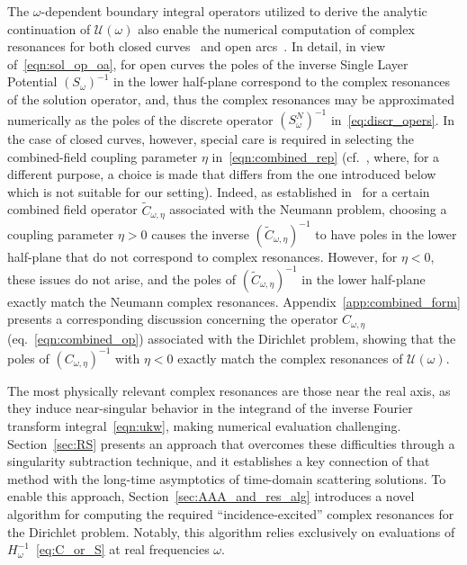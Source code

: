 \documentclass[11pt]{article}
\theoremstyle{plain}
\theoremstyle{remark}
\begin{document}
The $\omega$-dependent boundary integral operators utilized to derive
the analytic continuation of $\mathcal{U}(\omega)$ also enable the
numerical computation of complex resonances for both closed
curves~\cite{steinbach2017combined} and open arcs~\cite[Sec.
2]{bst}. In detail, in view of~\eqref{eqn:sol_op_oa}, for open curves
the poles of the inverse Single Layer Potential $(S_\omega)^{-1}$ in
the lower half-plane correspond to the complex resonances of the
solution operator, and, thus the complex resonances may be
approximated numerically as the poles of the discrete operator
$(S_\omega^N)^{-1}$ in~\eqref{eq:discr_opers}. In the case of closed
curves, however, special care is required in selecting the
combined-field coupling parameter $\eta$ in~\eqref{eqn:combined_rep}
(cf.~\cite{taylorbook}, where, for a different purpose, a choice is
made that differs from the one introduced below which is not suitable
for our setting).  Indeed, as established
in~\cite{steinbach2017combined} for a certain combined field operator
$\widetilde{C}_{\omega,\eta}$ associated with the Neumann problem,
choosing a coupling parameter $\eta > 0$ causes the inverse
$(\widetilde{C}_{\omega,\eta})^{-1}$ to have poles in the lower
half-plane that do not correspond to complex resonances. However, for
$\eta < 0$, these issues do not arise, and the poles of
$(\widetilde{C}_{\omega,\eta})^{-1}$ in the lower half-plane exactly
match the Neumann complex resonances. Appendix~\ref{app:combined_form}
presents a corresponding discussion concerning the operator
$C_{\omega,\eta}$ (eq.~\eqref{eqn:combined_op}) associated with the
Dirichlet problem, showing that the poles of $(C_{\omega,\eta})^{-1}$
with $\eta < 0$ exactly match the complex resonances of
$\mathcal{U}(\omega)$.
 
The most physically relevant complex resonances are those near the
real axis, as they induce near-singular behavior in the integrand of
the inverse Fourier transform integral~\eqref{eqn:ukw}, making
numerical evaluation challenging. Section~\ref{sec:RS} presents an
approach that overcomes these difficulties through a singularity
subtraction technique, and it establishes a key connection of that
method with the long-time asymptotics of time-domain scattering
solutions. To enable this approach, Section~\ref{sec:AAA_and_res_alg}
introduces a novel algorithm for computing the required
``incidence-excited'' complex resonances for the Dirichlet
problem. Notably, this algorithm relies exclusively on evaluations of
$H_{\omega}^{-1}$~\eqref{eq:C_or_S} at real frequencies $\omega$.
\end{document}
